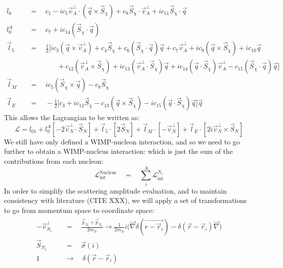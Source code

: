 \begin{equation}
\begin{split}
    l_0\quad  & =\quad c_1 - ic_5 \vec{v}^{\perp}_{A} \cdot(\vec{q} \times \vec{S}_\chi) + c_8 \vec{S}_\chi \cdot \vec{v}^{\perp}_{A} + ic_{11} \vec{S}_\chi \cdot \vec{q} \\
    l^A_0\quad &=\quad c_7 + ic_{14} (\vec{S}_\chi \cdot \vec{q}) \\
    \vec{l}_5\quad &=\quad \frac{1}{2} \big[ ic_3 (\vec{q} \times \vec{v}^{\perp}_{A}) + c_4 \vec{S}_\chi + c_6 (\vec{S}_\chi \cdot \vec{q}) \vec{q} + c_7 \vec{v}^{\perp}_{A} + ic_9 (\vec{q} \times \vec{S}_\chi) + ic_{10} \vec{q} \\
    &\qquad\qquad+ c_12 (\vec{v}^{\perp}_{A} \times \vec{S}_\chi) + ic_{13} (\vec{v}^{\perp}_{A} \cdot \vec{S}_\chi) \vec{q} + ic_{14}(\vec{q} \cdot \vec{S}_\chi)\vec{v}^{\perp}_{A} - c_{15} (\vec{S}_\chi \cdot \vec{q} ) \vec{q} \bigg] \\
    \vec{l}_M\quad &=\quad ic_5 (\vec{S}_\chi \times \vec{q}) - c_8 \vec{S}_\chi \\
    \vec{l}_E\quad &=\quad -\frac{1}{2} \bigg[ c_3 + ic_{12} \vec{S}_\chi - c_{13} (\vec{q} \times \vec{S}_\chi) - ic_{15} (\vec{q} \cdot \vec{S}_{\chi}) \vec{q} \bigg] \vec{q}
\end{split}
\label{eq:eft_operator_lagrangian_charges_and_currents}
\end{equation}
This allows the Lagrangian to be written as:
\begin{equation}
    \mathcal{L} = l_01 + l_0^A[-2\vec{v}^{\perp}_N \cdot \vec{S}_N] + \vec{l}_{5} \cdot [2\vec{S}_N] + \vec{l}_{M} \cdot [-\vec{v}^{\perp}_N] + \vec{l}_{E} \cdot [2i\vec{v}^{\perp}_N \times \vec{S}_{N} ]
\end{equation}
We still have only defined a WIMP-nucleon interaction, and so we need to go further to obtain a WIMP-nucleus interaction: which is just the sum of the contributions from each nucleon:
\begin{equation}
    \mathcal{L}^{\text{Nucleus}}_{\text{int}} \quad = \quad \sum_{i}^{A} \mathcal{L}^{N_i}_{\text{int}}
\end{equation}
In order to simplify the scattering amplitude evaluation, and to maintain consistency with literature (CITE XXX), we will apply a set of transformations to go from momentum space to coordinate space:
\begin{equation}
    \begin{split}
        -\vec{v}^{\perp}_{N_i}\quad &=\quad \frac{\vec{p}_{N_i} + \vec{p}^{'}_{N_i}}{2m_N} \rightarrow \frac{1}{2m_N}i \Bigg( \vec{\nabla}\delta(\vec{r - \vec{r}_i}) - \delta(\vec{r} - \vec{r}_i) \vec{\nabla} \Bigg) \\
        \vec{S}_{N_i}\quad &=\quad \vec{\sigma}(i) \\
        1\quad &\rightarrow\quad \delta(\vec{r} - \vec{r}_i)
    \end{split}
\end{equation}
